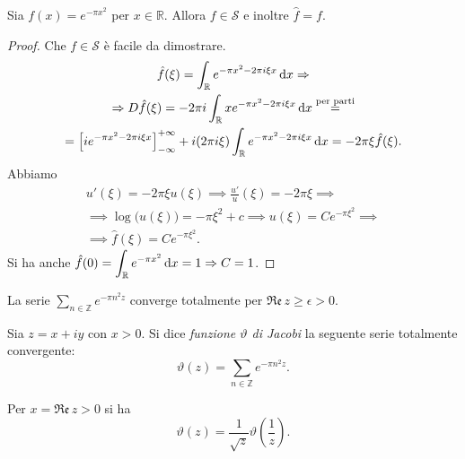 \begin{lm}
  Sia $f(x)=e^{-\pi x^2}$ per $x \in \mathbb{R}$. Allora $f \in \mathcal{S}$ e inoltre $\hat{f}=f$.
\end{lm}

\begin{proof}
  Che $f \in \mathcal{S}$ è facile da dimostrare.
  \begin{gather*}
    \hat{f}(\xi)=\int_{\mathbb{R}} e^{-\pi x^2-2\pi i\xi x}\mathop{}\!\mathrm{d} x \Rightarrow \\
    \Rightarrow D\hat{f}(\xi)=-2\pi i\int_{\mathbb{R}} xe^{-\pi x^2-2\pi i\xi x}\mathop{}\!\mathrm{d} x \overset{\text{per parti}}{=} \\
    =\left[ie^{-\pi x^2-2\pi i\xi x}\right]_{-\infty}^{+\infty}+i(2\pi i\xi)\int_{\mathbb{R}} e^{-\pi x^2-2\pi i\xi x}\mathop{}\!\mathrm{d} x=-2\pi \xi \hat{f}(\xi).
  \end{gather*}
  Abbiamo
  \begin{gather*}
    u'(\xi)=-2\pi\xi u(\xi) \implies \frac{u'}{u}(\xi)=-2\pi\xi \implies \\
    \implies \log\big(u(\xi)\big)=-\pi\xi^2+c \implies u(\xi)=Ce^{-\pi\xi^2} \implies \\
    \implies \hat{f}(\xi)=Ce^{-\pi\xi^2}.
  \end{gather*}
  Si ha anche $\displaystyle \hat{f}(0)=\int_{\mathbb{R}} e^{-\pi x^2}\mathop{}\!\mathrm{d} x=1 \Rightarrow C=1$.
\end{proof}

\begin{oss}
  La serie $\displaystyle \sum_{n \in \mathbb{Z}} e^{-\pi n^2 z}$ converge totalmente per $\mathfrak{Re}\,z \ge \epsilon>0$.
\end{oss}

\begin{defn}
  Sia $z=x+iy$ con $x>0$. Si dice \textit{funzione $\vartheta$ di Jacobi} la seguente serie totalmente convergente:
  $$\vartheta(z)=\sum_{n \in \mathbb{Z}} e^{-\pi n^2z}.$$
\end{defn}

\begin{lm}
  Per $x=\mathfrak{Re}\,z>0$ si ha
  $$\vartheta(z)=\frac{1}{\sqrt{z}}\vartheta\left(\frac{1}{z}\right).$$
\end{lm}


